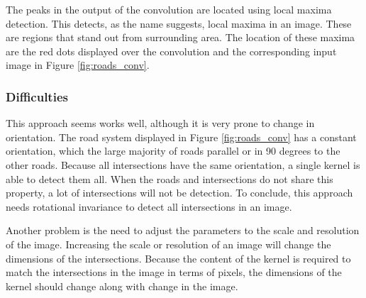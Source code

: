 The peaks in the output of the convolution are located using local maxima
detection. This detects, as the name suggests, local maxima in an image. These
are regions that stand out from surrounding area. The location of these maxima
are the red dots displayed over the convolution and the corresponding input
image in Figure \ref{fig:roads_conv}.

\subsubsection{Difficulties}

This approach seems works well, although it is very prone to change in
orientation. The road system displayed in Figure \ref{fig:roads_conv} has
a constant orientation, which the large majority of roads parallel or in 90
degrees to the other roads. Because all intersections have the same
orientation, a single kernel is able to detect them all. When the roads and
intersections do not share this property, a lot of intersections will not be
detection. To conclude, this approach needs rotational invariance to detect all
intersections in an image.


Another problem is the need to adjust the parameters to the scale and
resolution of the image. Increasing the scale or resolution of an image will
change the dimensions of the intersections. Because the content of the kernel
is required to match the intersections in the image in terms of pixels, the
dimensions of the kernel should change along with change in the image.




